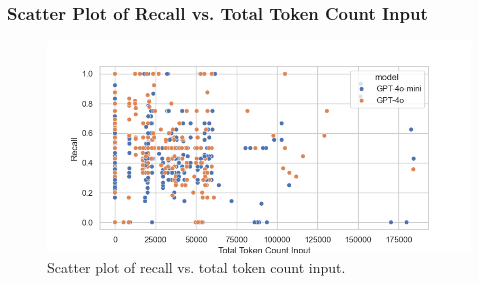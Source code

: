             \subsubsection{Scatter Plot of Recall vs. Total Token Count Input}
            \begin{figure}[H]
                \centering
                \includegraphics[scale=0.75]{images_exp2/recall/scatter_recall_vs_total_token_count_input.png}
                \caption{Scatter plot of recall vs. total token count input.}
                \label{fig:scatter_recall_vs_total_token_count_input}
            \end{figure}


        